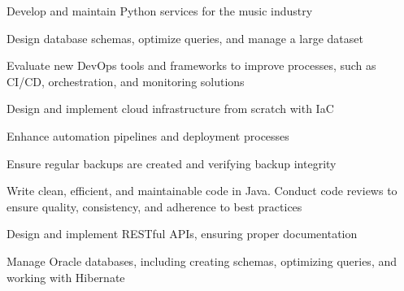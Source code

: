 \documentclass[]{willianpaixao-resume}
\begin{document}
\begin{minipage}[t]{0.64\textwidth}
\sectionsep
\begin{tightemize}
\item Develop and maintain Python services for the music industry
\item Design database schemas, optimize queries, and manage a large dataset
\item Evaluate new DevOps tools and frameworks to improve processes, such as CI/CD, orchestration, and monitoring solutions
\end{tightemize}
\sectionsep

\sectionsep
\begin{tightemize}
\item Design and implement cloud infrastructure from scratch with IaC
\item Enhance automation pipelines and deployment processes
\item Ensure regular backups are created and verifying backup integrity
\end{tightemize}
\sectionsep

\sectionsep
\begin{tightemize}
\item Write clean, efficient, and maintainable code in Java. Conduct code reviews to ensure quality, consistency, and adherence to best practices
\item Design and implement RESTful APIs, ensuring proper documentation
\item Manage Oracle databases, including creating schemas, optimizing queries, and working with Hibernate
\end{tightemize}
\end{minipage}
\end{document}
